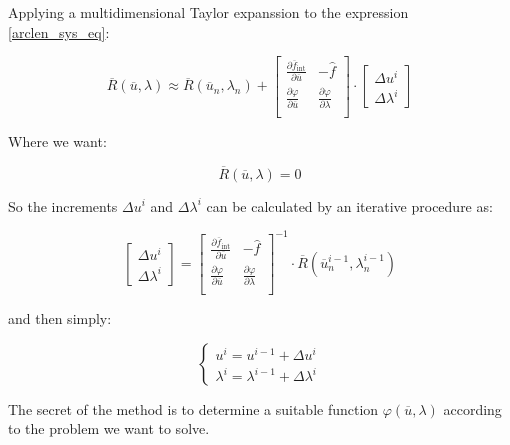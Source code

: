 Applying a multidimensional Taylor expanssion to the expression \ref{arclen_sys_eq}:

\begin{equation}
  \overline{R}(\overline{u},\lambda) \approx
  \overline{R}(\overline{u}_n,\lambda_n)
  +
  \begin{bmatrix}
  \frac{\partial \overline{f}_{\text{int}}}{\partial\overline{u}} & -\hat{f} \\ 
  \frac{\partial \varphi}{\partial\overline{u}} & \frac{\partial \varphi}{\partial\lambda} \\ 
  \end{bmatrix}
  \cdot
  \begin{bmatrix}
  \Delta u^i \\ 
  \Delta \lambda^i 
  \end{bmatrix}
\end{equation}

Where we want:

\begin{equation}
  \overline{R}(\overline{u},\lambda) = 0
\end{equation}

So the increments $ \Delta u^i$ and $\Delta \lambda^i$ can be calculated by an iterative procedure as:

\begin{equation}
  \begin{bmatrix}
  \Delta u^i \\ 
  \Delta \lambda^i 
  \end{bmatrix}
  =
  \begin{bmatrix}
  \frac{\partial \overline{f}_{\text{int}}}{\partial\overline{u}} & -\hat{f} \\ 
  \frac{\partial \varphi}{\partial\overline{u}} & \frac{\partial \varphi}{\partial\lambda} \\ 
  \end{bmatrix}^{-1}
  \cdot
  \overline{R}(\overline{u}_n^{i-1},\lambda_n^{i-1})
\end{equation}

and then simply:

\begin{equation}
\begin{cases} 
  u^i = u^{i-1} + \Delta u^i\\
  \lambda^i = \lambda^{i-1} + \Delta \lambda^i
\end{cases} 
\end{equation}




The secret of the method is to determine a suitable function $\varphi(\overline{u},\lambda)$ according to the problem we
want to solve.

